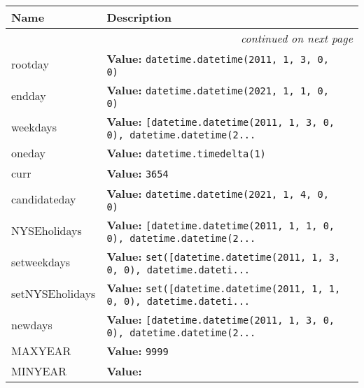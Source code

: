     \vspace{-1cm}
\hspace{\varindent}\begin{longtable}{|p{\varnamewidth}|p{\vardescrwidth}|l}
\cline{1-2}
\cline{1-2} \centering \textbf{Name} & \centering \textbf{Description}& \\
\cline{1-2}
\endhead\cline{1-2}\multicolumn{3}{r}{\small\textit{continued on next page}}\\\endfoot\cline{1-2}
\endlastfoot\raggedright r\-o\-o\-t\-d\-a\-y\- & \raggedright \textbf{Value:} 
{\tt datetime.datetime(2011, 1, 3, 0, 0)}&\\
\cline{1-2}
\raggedright e\-n\-d\-d\-a\-y\- & \raggedright \textbf{Value:} 
{\tt datetime.datetime(2021, 1, 1, 0, 0)}&\\
\cline{1-2}
\raggedright w\-e\-e\-k\-d\-a\-y\-s\- & \raggedright \textbf{Value:} 
{\tt \texttt{[}datetime.datetime(2011, 1, 3, 0, 0)\texttt{, }datetime.datetime(2\texttt{...}}&\\
\cline{1-2}
\raggedright o\-n\-e\-d\-a\-y\- & \raggedright \textbf{Value:} 
{\tt datetime.timedelta(1)}&\\
\cline{1-2}
\raggedright c\-u\-r\-r\- & \raggedright \textbf{Value:} 
{\tt 3654}&\\
\cline{1-2}
\raggedright c\-a\-n\-d\-i\-d\-a\-t\-e\-d\-a\-y\- & \raggedright \textbf{Value:} 
{\tt datetime.datetime(2021, 1, 4, 0, 0)}&\\
\cline{1-2}
\raggedright N\-Y\-S\-E\-h\-o\-l\-i\-d\-a\-y\-s\- & \raggedright \textbf{Value:} 
{\tt \texttt{[}datetime.datetime(2011, 1, 1, 0, 0)\texttt{, }datetime.datetime(2\texttt{...}}&\\
\cline{1-2}
\raggedright s\-e\-t\-w\-e\-e\-k\-d\-a\-y\-s\- & \raggedright \textbf{Value:} 
{\tt \texttt{set([}datetime.datetime(2011, 1, 3, 0, 0)\texttt{, }datetime.dateti\texttt{...}}&\\
\cline{1-2}
\raggedright s\-e\-t\-N\-Y\-S\-E\-h\-o\-l\-i\-d\-a\-y\-s\- & \raggedright \textbf{Value:} 
{\tt \texttt{set([}datetime.datetime(2011, 1, 1, 0, 0)\texttt{, }datetime.dateti\texttt{...}}&\\
\cline{1-2}
\raggedright n\-e\-w\-d\-a\-y\-s\- & \raggedright \textbf{Value:} 
{\tt \texttt{[}datetime.datetime(2011, 1, 3, 0, 0)\texttt{, }datetime.datetime(2\texttt{...}}&\\
\cline{1-2}
\raggedright M\-A\-X\-Y\-E\-A\-R\- & \raggedright \textbf{Value:} 
{\tt 9999}&\\
\cline{1-2}
\raggedright M\-I\-N\-Y\-E\-A\-R\- & \raggedright \textbf{Value:} 

\end{longtable}
